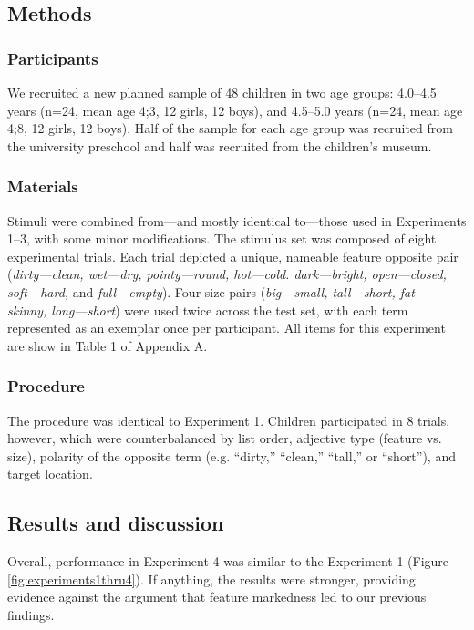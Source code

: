 \documentclass[man]{apa2}
\begin{document}
\subsection{Methods}

\subsubsection{Participants}

We recruited a new planned sample of 48 children in two age groups: 4.0--4.5 years (n=24, mean age 4;3, 12 girls, 12 boys), and 4.5--5.0 years (n=24, mean age 4;8, 12 girls, 12 boys).  Half of the sample for each age group was recruited from the university preschool and half was recruited from the children's museum.

\subsubsection{Materials}

Stimuli were combined from---and mostly identical to---those used in Experiments 1--3, with some minor modifications. The stimulus set was composed of eight experimental trials.  Each trial depicted a unique, nameable feature opposite pair (\emph{dirty---clean, wet---dry, pointy---round, hot---cold. dark---bright, open---closed, soft---hard,} and \emph{full---empty}). Four size pairs (\emph{big---small, tall---short, fat---skinny, long---short}) were used twice across the test set, with each term represented as an exemplar once per participant.  All items for this experiment are show in Table 1 of Appendix A. 

\subsubsection{Procedure}

The procedure was identical to Experiment 1. Children participated in 8 trials, however, which were counterbalanced by list order, adjective type (feature vs. size), polarity of the opposite term (e.g. ``dirty,'' ``clean,'' ``tall,'' or ``short''), and target location. 

\subsection{Results and discussion}

Overall, performance in Experiment 4 was similar to the Experiment 1 (Figure \ref{fig:experiments1thru4}). If anything, the results were stronger, providing evidence against the argument that feature markedness led to our previous findings. 
\end{document}
